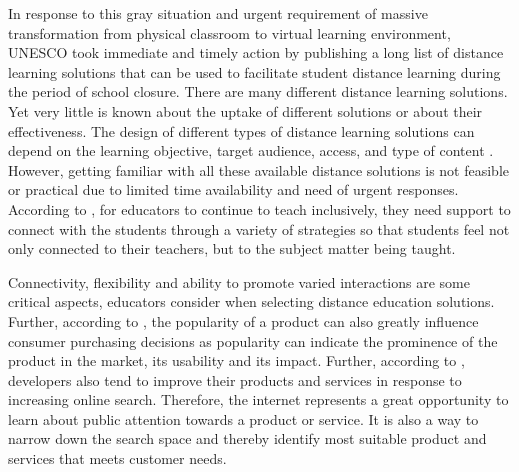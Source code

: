 \documentclass[11pt,a4paper,]{article}
\begin{document}
In response to this gray situation and urgent requirement of massive transformation from physical classroom to virtual learning environment, UNESCO took immediate and timely action by publishing a long list of distance learning solutions that can be used to facilitate student distance learning during the period of school closure. There are many different distance learning solutions. Yet very little is known about the uptake of different solutions or about their effectiveness. The design of different types of distance learning solutions can depend on the learning objective, target audience, access, and type of content \autocite{moore2011learning}. However, getting familiar with all these available distance solutions is not feasible or practical due to limited time availability and need of urgent responses. According to \textcite{carter2021teacher}, for educators to continue to teach inclusively, they need support to connect with the students through a variety of strategies so that students feel not only connected to their teachers, but to the subject matter being taught.

Connectivity, flexibility and ability to promote varied interactions are some critical aspects, educators consider when selecting distance education solutions. Further, according to \textcite{ahn2006utilizing}, the popularity of a product can also greatly influence consumer purchasing decisions as popularity can indicate the prominence of the product in the market, its usability and its impact. Further, according to \textcite{willis2020using}, developers also tend to improve their products and services in response to increasing online search. Therefore, the internet represents a great opportunity to learn about public attention towards a product or service. It is also a way to narrow down the search space and thereby identify most suitable product and services that meets customer needs.
\end{document}
